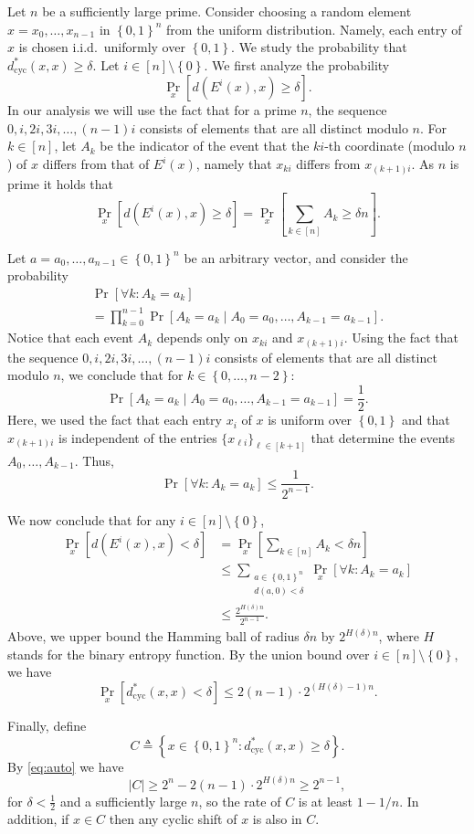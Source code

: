 \documentclass[twocolumn,twoside]{IEEEtran}
\theoremstyle{plain}
\newcommand{\mathset}[1]{\left\{#1\right\}}
\newcommand{\abs}[1]{\left|#1\right|}
\newcommand{\sparenv}[1]{\left[ #1 \right]}
\renewcommand{\leq}{\leqslant}
\renewcommand{\geq}{\geqslant}
\newcommand{\eqdef}{\triangleq}
\newcommand{\dc}{d_{\mathrm{cyc}}}
\begin{document}
\begin{IEEEproof}
Let $n$ be a sufficiently large prime. Consider choosing a random
element $x=x_0,\dots,x_{n-1}$ in $\mathset{0,1}^n$ from the uniform
distribution.  Namely, each entry of $x$ is chosen i.i.d.~uniformly
over $\mathset{0,1}$.  We study the probability that $\dc^*(x,x) \geq
\delta$.  Let $i \in [n] \setminus \mathset{0}$.  We first analyze the
probability
\[
\Pr_x\sparenv{d(E^i(x),x)\geq \delta}.
\]
In our analysis we will use the fact that for a prime $n$, the
sequence $0,i,2i,3i,\dots, (n-1)i$ consists of elements that are all
distinct modulo $n$.  For $k \in [n]$, let $A_k$ be the indicator of
the event that the $ki$-th coordinate (modulo $n$) of $x$ differs from
that of $E^i(x)$, namely that $x_{ki}$ differs from $x_{(k+1)i}$.  As
$n$ is prime it holds that
\[
\Pr_x\sparenv{d(E^i(x),x)\geq \delta} = \Pr_x\sparenv{\sum_{k\in[n]} A_k \geq \delta n}.
\]

Let $a=a_0,\dots,a_{n-1} \in \mathset{0,1}^n$ be an arbitrary vector,
and consider the probability
\begin{multline*}
  \Pr\sparenv{\forall k: A_k=a_k}  \\
  = \prod_{k=0}^{n-1}\Pr\sparenv{A_k=a_k \mid A_0=a_0, \dots,A_{k-1}=a_{k-1}}.
\end{multline*}
Notice that each event $A_k$ depends only on $x_{ki}$ and
$x_{(k+1)i}$.  Using the fact that the sequence $0,i,2i,3i,\dots,
(n-1)i$ consists of elements that are all distinct modulo $n$, we
conclude that for $k \in \mathset{0,\dots, n-2}$:
\[
\Pr\sparenv{A_k=a_k \mid A_0=a_0, \dots,A_{k-1}=a_{k-1}} = \frac{1}{2}.
\]
Here, we used the fact that each entry $x_i$ of $x$ is uniform over
$\mathset{0,1}$ and that $x_{(k+1)i}$ is independent of the entries
$\{x_{\ell i}\}_{\ell \in [k+1]}$ that determine the events
$A_0,\dots,A_{k-1}$.  Thus,
\[
\Pr\sparenv{\forall k: A_k=a_k}  \leq \frac{1}{2^{n-1}}.
\]

We now conclude that for any $i\in[n]\setminus\mathset{0}$,
\begin{align*}
\Pr_x\sparenv{d(E^i(x),x) < \delta} & = \Pr_x\sparenv{\sum_{k\in[n]} A_k < \delta n} \\
& \leq \sum_{\substack{a \in \mathset{0,1}^n \\ d(a,0)< \delta}}\Pr_x\sparenv{\forall k: A_k=a_k} \\
&\leq \frac{2^{H(\delta) n}}{2^{n-1}}.
\end{align*}
Above, we upper bound the Hamming ball of radius $\delta n$ by
$2^{H(\delta) n}$, where $H$ stands for the binary entropy function.
By the union bound over $i \in [n] \setminus \mathset{0}$, we have
\begin{equation}
\label{eq:auto}
\Pr_x\sparenv{\dc^*(x,x)< \delta} \leq 2(n-1)\cdot2^{(H(\delta) -1)n}.
\end{equation}

Finally, define
\[C \eqdef \mathset{ x\in\mathset{0,1}^n : \dc^*(x,x)\geq \delta}.\]
By \eqref{eq:auto} we have
\[\abs{C} \geq 2^n-2(n-1)\cdot 2^{H(\delta) n} \geq
2^{n-1},\]
for $\delta<\frac{1}{2}$ and a sufficiently large $n$,
so the rate of $C$ is at least $1-1/n$. 
In addition, if $x \in C$ then any cyclic shift of $x$ is also in $C$.
\end{IEEEproof}
\end{document}
